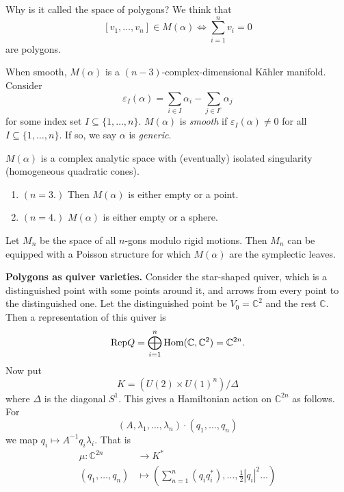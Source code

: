 {Why is it called the space of polygons?
We think that
$$
[v_1,\ldots,v_n] \in M(\alpha) \iff \sum_{i=1}^nv_i=0
$$
are polygons.

When smooth, $M(\alpha)$ is a $(n-3)$-complex-dimensional
Kähler manifold. Consider
$$
\varepsilon_I(\alpha)=\sum_{i \in I}\alpha_i
-\sum_{j \in I^c}\alpha_j
$$
for some index set $I \subseteq \{1,\ldots, n\}$.
$M(\alpha)$ is {\it smooth} if $\varepsilon_I(\alpha)
\neq 0$ for all $I\subseteq \{1,\ldots,n\}$.
If so, we say $\alpha$ is {\it generic}.

\begin{theorem}
\label{theorem-Kapovich-Millson}
$M(\alpha)$ is a complex analytic space
with (eventually) isolated singularity
(homogeneous quadratic cones).
\end{theorem}

\begin{example}
\label{examples-polygon-moduli-spaces}
\begin{enumerate}
\item $(n=3.)$ Then $M(\alpha)$ is either empty or a point.

\item $(n=4.)$ $M(\alpha)$ is either empty or a sphere.
\end{enumerate}
\end{example}

\begin{remark}
\label{remark-Hausmann-Knutson}
Let $M_n$ be the space of all $n$-gons
modulo rigid motions. Then $M_n$ 
can be equipped with a Poisson structure
for which $M(\alpha)$ are the symplectic
leaves. 

\medskip\noindent
{\bf Polygons as quiver varieties.}
Consider the star-shaped quiver,
which is a distinguished point with some points around it,
and arrows from every point to the distinguished one.
Let the distinguished point be $V_0=\mathbb{C}^2$ and
the rest $\mathbb{C}$. Then a representation of this quiver
is
$$
\text{Rep}Q=\bigoplus_{i=1}^n \mathop{\mathrm{Hom}}\nolimits(\mathbb{C},\mathbb{C}^2)=\mathbb{C}^{2n}.
$$
Now put
$$
K=(U(2) \times U(1)^n)/\Delta
$$
where $\Delta$ is the diagonal $S^1$.
This gives a Hamiltonian action on $\mathbb{C}^{2n}$
as follows. For
$$
(A,\lambda_1,\ldots,\lambda_n)\cdot (q_1,\ldots,q_n)
$$
we map
$q_i \mapsto  A^{-1}q_i \lambda_i$.
That is
\begin{align*}
\mu: \mathbb{C}^{2n} &\longrightarrow K^* \\
(q_1,\ldots,q_n) &\longmapsto 
\left(\sum_{n=1}^n (q_iq_i^* ),\ldots,\frac{1}{2}|q_i|^2\ldots\right)
\end{align*}


\end{remark}}
